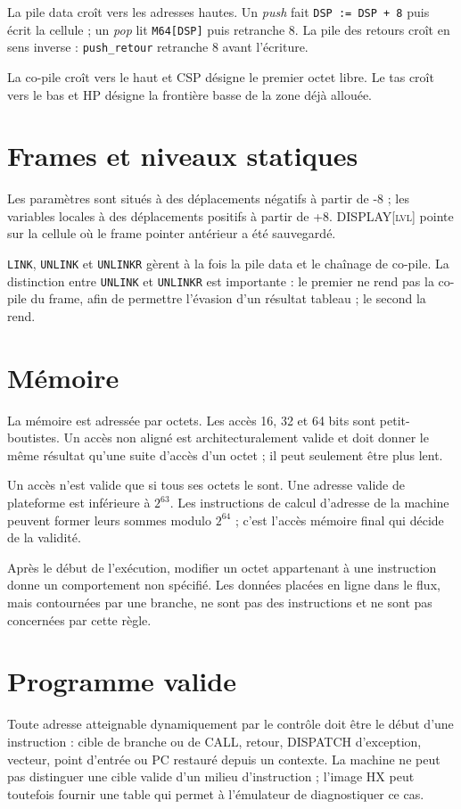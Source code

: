 \documentclass[10pt,a4paper,twoside,openany]{book}
\newcommand{\code}[1]{\texttt{#1}}
\newcommand{\reg}[1]{\textsc{#1}}
\begin{document}
La pile data croît vers les adresses hautes. Un \emph{push} fait \code{DSP := DSP + 8} puis écrit la cellule ; un \emph{pop} lit \code{M64[DSP]} puis retranche 8. La pile des retours croît en sens inverse : \code{push\_retour} retranche 8 avant l'écriture.

La co-pile croît vers le haut et \reg{CSP} désigne le premier octet libre. Le tas croît vers le bas et \reg{HP} désigne la frontière basse de la zone déjà allouée.

\section{Frames et niveaux statiques}
Les paramètres sont situés à des déplacements négatifs à partir de -8 ; les variables locales à des déplacements positifs à partir de +8. \reg{DISPLAY[lvl]} pointe sur la cellule où le frame pointer antérieur a été sauvegardé.

\texttt{LINK}, \texttt{UNLINK} et \texttt{UNLINKR} gèrent à la fois la pile data et le chaînage de co-pile. La distinction entre \texttt{UNLINK} et \texttt{UNLINKR} est importante : le premier ne rend pas la co-pile du frame, afin de permettre l'évasion d'un résultat tableau ; le second la rend.

\section{Mémoire}
La mémoire est adressée par octets. Les accès 16, 32 et 64 bits sont petit-boutistes. Un accès non aligné est architecturalement valide et doit donner le même résultat qu'une suite d'accès d'un octet ; il peut seulement être plus lent.

Un accès n'est valide que si tous ses octets le sont. Une adresse valide de plateforme est inférieure à $2^{63}$. Les instructions de calcul d'adresse de la machine peuvent former leurs sommes modulo $2^{64}$ ; c'est l'accès mémoire final qui décide de la validité.

\begin{warningbox}
Après le début de l'exécution, modifier un octet appartenant à une instruction donne un comportement non spécifié. Les données placées en ligne dans le flux, mais contournées par une branche, ne sont pas des instructions et ne sont pas concernées par cette règle.
\end{warningbox}

\section{Programme valide}
Toute adresse atteignable dynamiquement par le contrôle doit être le début d'une instruction : cible de branche ou de CALL, retour, DISPATCH d'exception, vecteur, point d'entrée ou PC restauré depuis un contexte. La machine ne peut pas distinguer une cible valide d'un milieu d'instruction ; l'image HX peut toutefois fournir une table qui permet à l'émulateur de diagnostiquer ce cas.
\end{document}

